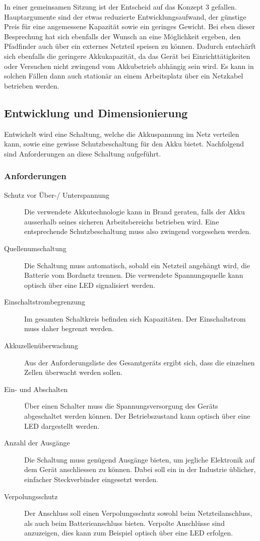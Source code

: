 \documentclass[main.tex]{subfiles} %
\begin{document}
In einer gemeinsamen Sitzung ist der Entscheid auf das Konzept 3 gefallen.
Hauptargumente sind der etwas reduzierte Entwicklungsaufwand, der günstige
Preis für eine angemessene Kapazität sowie ein geringes Gewicht. Bei eben
dieser Besprechung hat sich ebenfalls der Wunsch an eine Möglichkeit ergeben,
den Pfadfinder auch über ein externes Netzteil speisen zu können. Dadurch
entschärft sich ebenfalls die geringere Akkukapazität, da das Gerät bei
Einrichttätigkeiten oder Versuchen nicht zwingend vom Akkubetrieb abhängig sein
wird. Es kann in solchen Fällen dann auch stationär an einem Arbeitsplatz über
ein Netzkabel betrieben werden.

\subsection*{Entwicklung und Dimensionierung}

Entwickelt wird eine Schaltung, welche die Akkuspannung im Netz verteilen kann,
sowie eine gewisse Schutzbeschaltung für den Akku bietet. Nachfolgend sind
Anforderungen an diese Schaltung aufgeführt.

\subsubsection*{Anforderungen}
\begin{description}
    \item[Schutz vor Über-/ Unterspannung] Die verwendete Akkutechnologie kann in Brand
          geraten, falls der Akku ausserhalb seines sicheren Arbeitsbereichs betrieben
          wird. Eine entsprechende Schutzbeschaltung muss also zwingend vorgesehen
          werden.
    \item[Quellenumschaltung] Die Schaltung muss automatisch, sobald ein Netzteil
          angehängt wird, die Batterie vom Bordnetz trennen. Die verwendete
          Spannungsquelle kann optisch über eine LED signalisiert werden.
    \item[Einschaltstrombegrenzung] Im gesamten Schaltkreis befinden sich Kapazitäten.
          Der Einschaltstrom muss daher begrenzt werden.
    \item[Akkuzellenüberwachung] Aus der Anforderungsliste des Gesamtgeräts ergibt sich,
          dass die einzelnen Zellen überwacht werden sollen.
    \item[Ein- und Abschalten] Über einen Schalter muss die Spannungsversorgung des
          Geräts abgeschaltet werden können. Der Betriebszustand kann optisch über eine
          LED dargestellt werden.
    \item[Anzahl der Ausgänge] Die Schaltung muss genügend Ausgänge bieten, um jegliche
          Elektronik auf dem Gerät anschliessen zu können. Dabei soll ein in der
          Industrie üblicher, einfacher Steckverbinder eingesetzt werden.
    \item[Verpolungsschutz] Der Anschluss soll einen Verpolungsschutz sowohl beim
          Netzteilanschluss, als auch beim Batterieanschluss bieten. Verpolte Anschlüsse
          sind anzuzeigen, dies kann zum Beispiel optisch über eine LED erfolgen.
\end{description}
\end{document}

